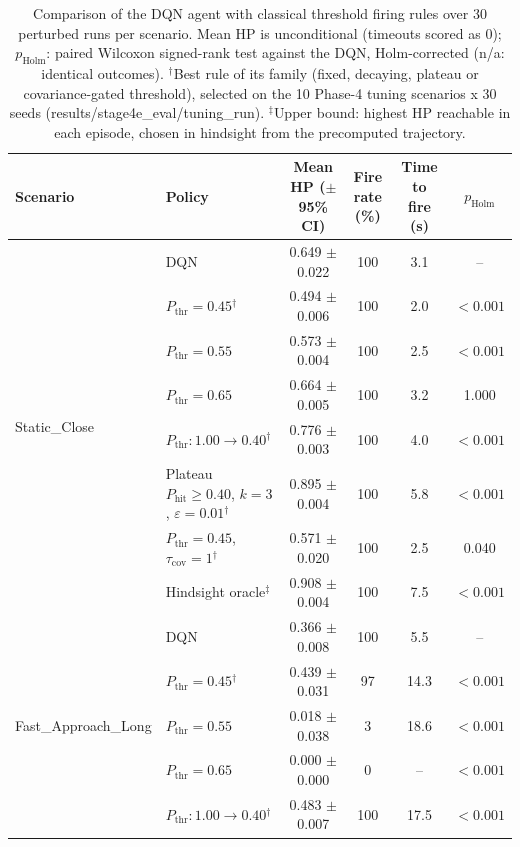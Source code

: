 \begin{table}[htbp]
\centering
\caption{Comparison of the DQN agent with classical threshold firing rules over 30 perturbed runs per scenario. Mean HP is unconditional (timeouts scored as 0); $p_{\mathrm{Holm}}$: paired Wilcoxon signed-rank test against the DQN, Holm-corrected (n/a: identical outcomes). $^{\dagger}$Best rule of its family (fixed, decaying, plateau or covariance-gated threshold), selected on the 10 Phase-4 tuning scenarios x 30 seeds (results/stage4e_eval/tuning_run). $^{\ddagger}$Upper bound: highest HP reachable in each episode, chosen in hindsight from the precomputed trajectory.}
\label{tab:comparison-traditional-rl}
\small
\begin{tabular}{llcccc}
\toprule
\textbf{Scenario} & \textbf{Policy} & \textbf{Mean HP ($\pm$95\% CI)} & \textbf{Fire rate (\%)} & \textbf{Time to fire (s)} & $p_{\mathrm{Holm}}$ \\
\midrule
\multirow{8}{*}{Static\_Close} & DQN & 0.649 $\pm$ 0.022 & 100 & 3.1 & -- \\
 & $P_{\mathrm{thr}}=0.45$$^{\dagger}$ & 0.494 $\pm$ 0.006 & 100 & 2.0 & $<0.001$ \\
 & $P_{\mathrm{thr}}=0.55$ & 0.573 $\pm$ 0.004 & 100 & 2.5 & $<0.001$ \\
 & $P_{\mathrm{thr}}=0.65$ & 0.664 $\pm$ 0.005 & 100 & 3.2 & 1.000 \\
 & $P_{\mathrm{thr}}: 1.00 \to 0.40$$^{\dagger}$ & 0.776 $\pm$ 0.003 & 100 & 4.0 & $<0.001$ \\
 & Plateau $P_{\mathrm{hit}}\geq0.40$, $k=3$, $\varepsilon=0.01$$^{\dagger}$ & 0.895 $\pm$ 0.004 & 100 & 5.8 & $<0.001$ \\
 & $P_{\mathrm{thr}}=0.45$, $\tau_{\mathrm{cov}}=1$$^{\dagger}$ & 0.571 $\pm$ 0.020 & 100 & 2.5 & 0.040 \\
 & Hindsight oracle$^{\ddagger}$ & 0.908 $\pm$ 0.004 & 100 & 7.5 & $<0.001$ \\
\midrule
\multirow{8}{*}{Fast\_Approach\_Long} & DQN & 0.366 $\pm$ 0.008 & 100 & 5.5 & -- \\
 & $P_{\mathrm{thr}}=0.45$$^{\dagger}$ & 0.439 $\pm$ 0.031 & 97 & 14.3 & $<0.001$ \\
 & $P_{\mathrm{thr}}=0.55$ & 0.018 $\pm$ 0.038 & 3 & 18.6 & $<0.001$ \\
 & $P_{\mathrm{thr}}=0.65$ & 0.000 $\pm$ 0.000 & 0 & -- & $<0.001$ \\
 & $P_{\mathrm{thr}}: 1.00 \to 0.40$$^{\dagger}$ & 0.483 $\pm$ 0.007 & 100 & 17.5 & $<0.001$ \\

\end{tabular}
\end{table}
